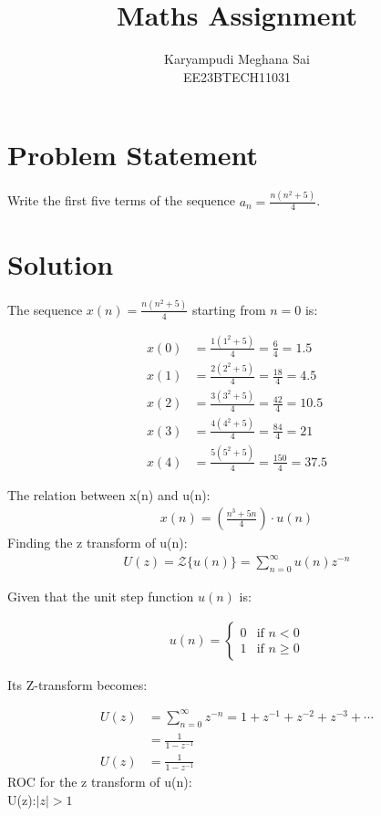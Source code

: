 \documentclass{article}
\begin{document}
\title{Maths Assignment}
\author{Karyampudi Meghana Sai\\ EE23BTECH11031}
\maketitle

\section*{Problem Statement}
Write the first five terms of the sequence \(a_n = \frac{n(n^2+5)}{4}\).

\section*{Solution}
The sequence \(x(n) = \frac{n(n^2+5)}{4}\) starting from \(n = 0\) is:

\begin{align*}
x(0) &= \frac{1(1^2+5)}{4} = \frac{6}{4} = 1.5 \\
x(1) &= \frac{2(2^2+5)}{4} = \frac{18}{4} = 4.5 \\
x(2) &= \frac{3(3^2+5)}{4} = \frac{42}{4} = 10.5 \\
x(3) &= \frac{4(4^2+5)}{4} = \frac{84}{4} = 21 \\
x(4) &= \frac{5(5^2+5)}{4} = \frac{150}{4} = 37.5 
\end{align*}



The relation between x(n) and u(n):
\begin{align}
 x(n) = \left(\frac{n^3+5n}{4}\right) \cdot u(n)
 \end{align}
Finding the z transform of u(n):
\begin{align}
U(z) = \mathcal{Z}\{u(n)\} = \sum_{n=0}^{\infty} u(n)z^{-n}
\end{align}

Given that the unit step function \(u(n)\) is:

\begin{align} 
u(n) = \begin{cases} 0 & \text{if } n < 0 \\ 1 & \text{if } n \geq 0 \end{cases}
 \end{align}

Its Z-transform becomes:

\begin{align}
U(z) &= \sum_{n=0}^{\infty} z^{-n} = 1 + z^{-1} + z^{-2} + z^{-3} + \dotsb \nonumber \\
&= \frac{1}{1 - z^{-1}} \nonumber \\
U(z) &= \frac{1}{1- z^{-1}}
\end{align}
ROC for the z transform of u(n):\\
 U(z):$\lvert z \rvert > 1$
\end{document}
